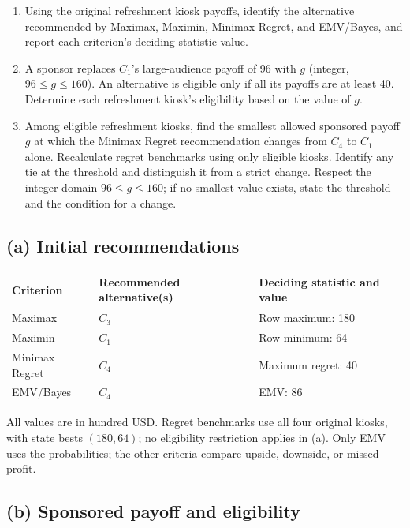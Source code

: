 \begin{enumerate}[label=\textbf{(\alph*)},leftmargin=*]
	\item Using the original refreshment kiosk payoffs, identify the alternative recommended by Maximax, Maximin, Minimax Regret, and EMV/Bayes, and report each criterion's deciding statistic value. 

	\item A sponsor replaces $C_1$'s large-audience payoff of 96 with $g$ (integer, $96\leq g\leq160$). An alternative is eligible only if all its payoffs are at least 40. Determine each refreshment kiosk's eligibility based on the value of $g$. 

	\item Among eligible refreshment kiosks, find the smallest allowed sponsored payoff $g$ at which the Minimax Regret recommendation changes from $C_4$ to $C_1$ alone. Recalculate regret benchmarks using only eligible kiosks. Identify any tie at the threshold and distinguish it from a strict change. Respect the integer domain $96\leq g\leq160$; if no smallest value exists, state the threshold and the condition for a change. 
\end{enumerate}
\label{sol:q2a}
\subsection*{(a) Initial recommendations }
\begin{center}
\begin{tabular}{lll}\toprule
Criterion & Recommended alternative(s) & Deciding statistic and value\\ \midrule
Maximax & $C_3$ & Row maximum: 180\\
Maximin & $C_1$ & Row minimum: 64\\
Minimax Regret & $C_4$ & Maximum regret: 40\\
EMV/Bayes & $C_4$ & EMV: 86\\
\bottomrule\end{tabular}
\end{center}
All values are in hundred USD. Regret benchmarks use all four original kiosks, with state bests $(180,64)$; no eligibility restriction applies in (a). Only EMV uses the probabilities; the other criteria compare upside, downside, or missed profit.
\secInicio[sec:q2]



\label{sol:q2b}
\subsection*{(b) Sponsored payoff and eligibility }

